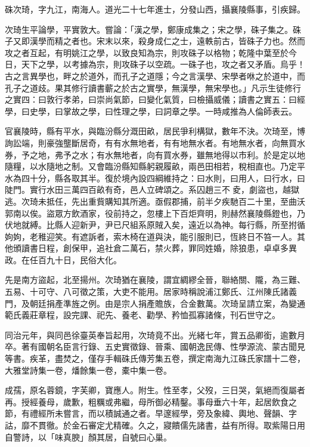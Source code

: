 \begin{pinyinscope}
硃次琦，字九江，南海人。道光二十七年進士，分發山西，攝襄陵縣事，引疾歸。

次琦生平論學，平實敦大。嘗論：「漢之學，鄭康成集之；宋之學，硃子集之。硃子又即漢學而精之者也。宋末以來，殺身成仁之士，遠軼前古，皆硃子力也。然而攻之者互起，有明姚江之學，以致良知為宗，則攻硃子以格物；乾隆中葉至於今日，天下之學，以考據為宗，則攻硃子以空疏。一硃子也，攻之者又矛盾。烏乎！古之言異學也，畔之於道外，而孔子之道隱；今之言漢學、宋學者咻之於道中，而孔子之道歧。果其修行讀書蘄之於古之實學，無漢學，無宋學也。」凡示生徒修行之實四：曰敦行孝弟，曰崇尚氣節，曰變化氣質，曰檢攝威儀；讀書之實五：曰經學，曰史學，曰掌故之學，曰性理之學，曰詞章之學。一時咸推為人倫師表云。

官襄陵時，縣有平水，與臨汾縣分溉田畝，居民爭利構獄，數年不決。次琦至，博詢訟端，則豪強壟斷居奇，有有水無地者，有有地無水者。有地無水者，向無買水券，予之地，弗予之水；有水無地者，向有買水券，雖無地得以市利。於是定以地隨糧，以水隨地之制。又會臨汾縣知縣躬親履畝，兩邑田相若，稅相直也。乃定平水為四十分，縣各取其半。復於境內設四綱維持之：曰水則，曰用人，曰行水，曰陡門。實行水田三萬四百畝有奇，邑人立碑頌之。系囚趙三不夌，劇盜也，越獄逃。次琦未抵任，先出重貲購知其所適。亟假郡捕，前半夕疾馳百二十里，至曲沃郭南以俟。盜眾方飲酒家，役前持之，忽樓上下百炬齊明，則赫然襄陵縣鐙也，乃伏地就縛。比縣人迎新尹，尹已尺組系原賊入矣，遠近以為神。每行縣，所至拊循姁姁，老稚迎笑。有遮訴者，索木椅在道與決，能引服則已，恆終日不笞一人。其他頒讀書日程，創保甲，追社倉二萬石，禁火葬，罪同姓婚，除狼患，卓卓多異政。在任百九十日，民俗大化。

先是南方盜起，北至揚州。次琦猶在襄陵，謂宜綢繆全晉，聯絡關、隴，為三難、五易、十可守、八可徵之策，大吏不能用。居家時稱說浦江鄭氏、江州陳氏諸義門，及朝廷捐產準旌之例。由是宗人捐產贍族，合金數萬。次琦呈請立案，為變通範氏義莊章程，設完課、祀先、養老、勸學、矜恤孤寡諸條，刊石世守之。

同治元年，與同邑徐臺英奉旨起用，次琦竟不出。光緒七年，賞五品卿銜，逾數月卒。著有國朝名臣言行錄、五史實徵錄、晉乘、國朝逸民傳、性學源流、蒙古聞見等書。疾革，盡焚之，僅存手輯硃氏傳芳集五卷，撰定南海九江硃氏家譜十二卷，大雅堂詩集一卷，燔餘集一卷，橐中集一卷。

成孺，原名蓉鏡，字芙卿，寶應人。附生。性至孝，父歿，三日哭，氣絕而復屬者再。授經養母，歲歉，粗糲或弗繼，母所御必精鑿。事母垂六十年，起居飲食之節，有禮經所未嘗言，而以積誠通之者。早邃經學，旁及象緯、輿地、聲韻、字詁，靡不貫徹。於金石審定尤精確。久之，寢饋儒先諸書，益有所得。取紫陽日用自警詩，以「味真腴」顏其居，自號曰心巢。


\end{pinyinscope}
